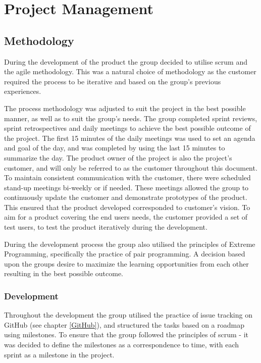 
\chapter{Project Management}

\section{Methodology}
\label{methodology}
During the development of the product the group decided to utilise scrum and the agile methodology. This was a natural choice of methodology as the customer required the process to be iterative and based on the group's previous experiences.

The process methodology was adjusted to suit the project in the best possible manner, as well as to suit the group's needs. The group completed sprint reviews, sprint retrospectives and daily meetings to achieve the best possible outcome of the project. The first 15 minutes of the daily meetings was used to set an agenda and goal of the day, and was completed by using the last 15 minutes to summarize the day. The product owner of the project is also the project's customer, and will only be referred to as the customer throughout this document. To maintain consistent communication with the customer, there were scheduled stand-up meetings bi-weekly or if needed. These meetings allowed the group to continuously update the customer and demonstrate prototypes of the product. This ensured that the product developed corresponded to customer's vision. To aim for a product covering the end users needs, the customer provided a set of test users, to test the product iteratively during the development.

During the development process the group also utilised the principles of Extreme Programming, specifically the practice of pair programming. A decision based upon the groups desire to maximize the learning opportunities from each other resulting in the best possible outcome. 

\subsection{Development}
Throughout the development the group utilised the practice of issue tracking on GitHub (see chapter  \ref{GitHub}), and structured the tasks based on a roadmap using milestones. To ensure that the group followed the principles of scrum - it was decided to define the milestones as a correspondence to time, with each sprint as a milestone in the project.

